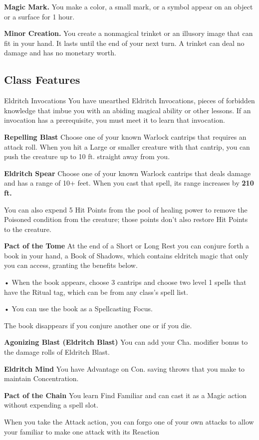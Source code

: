 {\textbf{Magic Mark.}} You make a color, a small mark, or a symbol appear on an object or a surface for 1 hour.

{\textbf{Minor Creation.}} You create a nonmagical trinket or an illusory image that can fit in your hand. It lasts until the end of your next turn. A trinket can deal no damage and has no monetary worth.



\subsection {Class Features}
\begingroup
\DndSetThemeColor[PhbMauve]
\begin{DndComment}[]{Eldritch Invocations}
	You have unearthed Eldritch Invocations, pieces of forbidden knowledge that imbue you with an abiding magical ability or other lessons. If an invocation has a prerequisite, you must meet it to learn that invocation.
	
	{\textbf{Repelling Blast}}
	Choose one of your known Warlock cantrips that requires an attack roll. When you hit a Large or smaller creature with that cantrip, you can push the creature up to 10 ft. straight away from you.
	
	{\textbf{Eldritch Spear}}
	Choose one of your known Warlock cantrips that deals damage and has a range of 10+ feet. When you cast that spell, its range increases by {\textbf{210 ft.}}
	
	You can also expend 5 Hit Points from the pool of healing power to remove the Poisoned condition from the creature; those points don’t also restore Hit Points to the creature.
	
	{\textbf{Pact of the Tome}}
	At the end of a Short or Long Rest you can conjure forth a book in your hand, a Book of Shadows, which contains eldritch magic that only you can access, granting the benefits below.
	
	• When the book appears, choose 3 cantrips and choose two level 1 spells that have the Ritual tag, which can be from any class’s spell list.
	
	• You can use the book as a Spellcasting Focus.
	
	The book disappears if you conjure another one or if you die.
	
	{\textbf{Agonizing Blast (Eldritch Blast)}}
	You can add your Cha. modifier bonus to the damage rolls of Eldritch Blast.
	
	{\textbf{Eldritch Mind}}
	You have Advantage on Con. saving throws that you make to maintain Concentration.
	
	{\textbf{Pact of the Chain}}
	You learn Find Familiar and can cast it as a Magic action without expending a spell slot.
	
	When you take the Attack action, you can forgo one of your own attacks to allow your familiar to make one attack with its Reaction
	
	
\end{DndComment}

